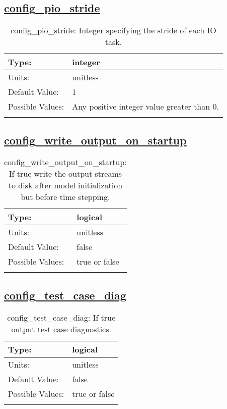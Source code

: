 \subsection[config\_pio\_stride]{\hyperref[sec:nm_tab_io]{config\_pio\_stride}}
\label{subsec:nm_sec_config_pio_stride}
\begin{center}
\begin{longtable}{| p{2.0in} || p{4.0in} |}
    \hline
    Type: & integer \\
    \hline
    Units: & \si{unitless} \\
    \hline
    Default Value: & 1 \\
    \hline
    Possible Values: & Any positive integer value greater than 0. \\
    \hline
    \caption{config\_pio\_stride: Integer specifying the stride of each IO task.}
\end{longtable}
\end{center}
\subsection[config\_write\_output\_on\_startup]{\hyperref[sec:nm_tab_io]{config\_write\_output\_on\_startup}}
\label{subsec:nm_sec_config_write_output_on_startup}
\begin{center}
\begin{longtable}{| p{2.0in} || p{4.0in} |}
    \hline
    Type: & logical \\
    \hline
    Units: & \si{unitless} \\
    \hline
    Default Value: & false \\
    \hline
    Possible Values: & true or false \\
    \hline
    \caption{config\_write\_output\_on\_startup: If true write the output streams to disk after model initialization but before time stepping.}
\end{longtable}
\end{center}
\subsection[config\_test\_case\_diag]{\hyperref[sec:nm_tab_io]{config\_test\_case\_diag}}
\label{subsec:nm_sec_config_test_case_diag}
\begin{center}
\begin{longtable}{| p{2.0in} || p{4.0in} |}
    \hline
    Type: & logical \\
    \hline
    Units: & \si{unitless} \\
    \hline
    Default Value: & false \\
    \hline
    Possible Values: & true or false \\
    \hline
    \caption{config\_test\_case\_diag: If true output test case diagnostics.}
\end{longtable}
\end{center}
